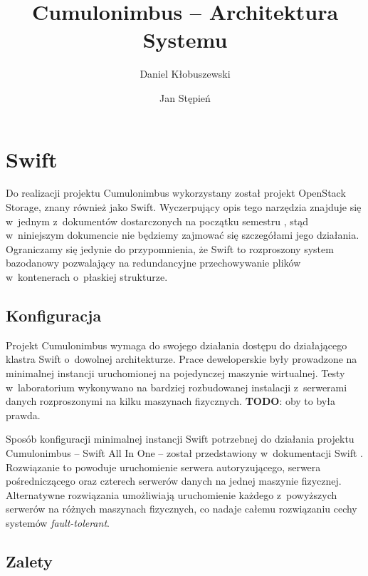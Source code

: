 


\title{Cumulonimbus -- Architektura Systemu}
\author{Daniel Kłobuszewski \and Jan Stępień}

\def\cb{Cumulonimbus}
\def\todo{\textbf{TODO}: }



\maketitle

\section{Swift}

Do realizacji projektu \cb{} wykorzystany został projekt OpenStack Storage, znany
również jako Swift. Wyczerpujący opis tego narzędzia znajduje się w~jednym
z~dokumentów dostarczonych na początku semestru \cite{qba-swift}, stąd
w~niniejszym dokumencie nie będziemy zajmować się szczegółami jego działania.
Ograniczamy się jedynie do przypomnienia, że Swift to rozproszony system
bazodanowy pozwalający na redundancyjne przechowywanie plików w~kontenerach
o~płaskiej strukturze.

\subsection{Konfiguracja}

Projekt \cb{} wymaga do swojego działania dostępu do działającego klastra Swift
o~dowolnej architekturze. Prace deweloperskie były prowadzone na minimalnej
instancji uruchomionej na pojedynczej maszynie wirtualnej. Testy w~laboratorium
wykonywano na bardziej rozbudowanej instalacji z~serwerami danych rozproszonymi
na kilku maszynach fizycznych. \todo oby to była prawda.

Sposób konfiguracji minimalnej instancji Swift potrzebnej do działania projektu
\cb{} -- Swift All In One -- został przedstawiony w~dokumentacji Swift
\cite{swift_doc}. Rozwiązanie to powoduje uruchomienie serwera autoryzującego,
serwera pośredniczącego oraz czterech serwerów danych na jednej maszynie
fizycznej. Alternatywne rozwiązania umożliwiają uruchomienie każdego
z~powyższych serwerów na różnych maszynach fizycznych, co nadaje całemu
rozwiązaniu cechy systemów \textit{fault-tolerant}.

\subsection{Zalety}

